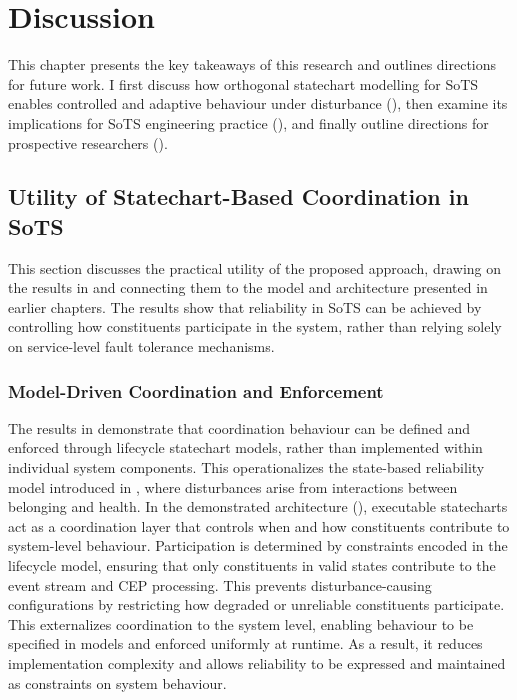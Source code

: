 \chapter{Discussion}\label{ch:discussion}
This chapter presents the key takeaways of this research and outlines directions for future work. I first discuss how orthogonal statechart modelling for SoTS enables controlled and adaptive behaviour under disturbance (), then examine its implications for SoTS engineering practice (), and finally outline directions for prospective researchers ().

\section{Utility of Statechart-Based Coordination in SoTS}\label{sec:discussion-utility}
This section discusses the practical utility of the proposed approach, drawing on the results in  and connecting them to the model and architecture presented in earlier chapters. The results show that reliability in SoTS can be achieved by controlling how constituents participate in the system, rather than relying solely on service-level fault tolerance mechanisms.

\subsection{Model-Driven Coordination and Enforcement}
The results in  demonstrate that coordination behaviour can be defined and enforced through lifecycle statechart models, rather than implemented within individual system components. This operationalizes the state-based reliability model introduced in , where disturbances arise from interactions between belonging and health.  In the demonstrated architecture (), executable statecharts act as a coordination layer that controls when and how constituents contribute to system-level behaviour. Participation is determined by constraints encoded in the lifecycle model, ensuring that only constituents in valid states contribute to the event stream and CEP processing. This prevents disturbance-causing configurations by restricting how degraded or unreliable constituents participate. This externalizes coordination to the system level, enabling behaviour to be specified in models and enforced uniformly at runtime. As a result, it reduces implementation complexity and allows reliability to be expressed and maintained as constraints on system behaviour.

